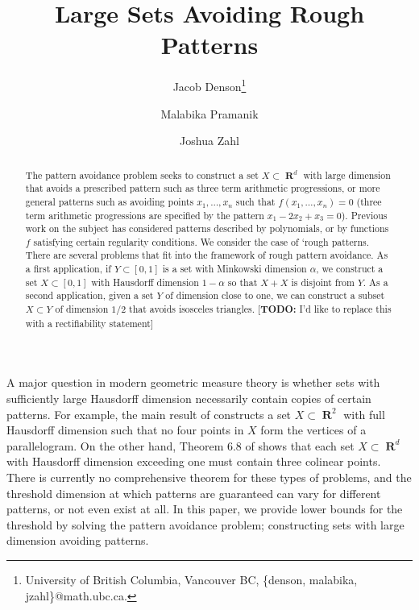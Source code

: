 \documentclass[dvipsnames,letterpaper,12pt]{article}
\title{Large Sets Avoiding Rough Patterns}
\author{Jacob Denson\thanks{University of British Columbia, Vancouver BC, \{denson, malabika, jzahl\}@math.ubc.ca.} \and Malabika Pramanik\footnotemark[1] \and Joshua Zahl\footnotemark[1]}
\numberwithin{equation}{section}
\theoremstyle{plain}
\DeclareMathOperator{\RR}{\mathbf{R}}
\begin{document}
\maketitle

\begin{abstract}
	The pattern avoidance problem seeks to construct a set $X\subset \RR^d$ with large dimension that avoids a prescribed pattern such as three term arithmetic progressions, or more general patterns such as avoiding points $x_1, \dots, x_n$ such that $f(x_1, \dots, x_n) = 0$ (three term arithmetic progressions are specified by the pattern $x_1 - 2x_2 + x_3 = 0$). Previous work on the subject has considered patterns described by polynomials, or by functions $f$ satisfying certain regularity conditions. We consider the case of `rough patterns.
	There are several problems that fit into the framework of rough pattern avoidance. As a first application, if $Y \subset [0,1]$ is a set with Minkowski dimension $\alpha$, we construct a set $X \subset [0,1]$ with Hausdorff dimension $1-\alpha$ so that $X+X$ is disjoint from $Y$. As a second application, given a set $Y$ of dimension close to one, we can construct a subset $X \subset Y$ of dimension $1/2$ that avoids isosceles triangles. [{\bf{TODO:}} I'd like to replace this with a rectifiability statement]
\end{abstract}













A major question in modern geometric measure theory is whether sets with sufficiently large Hausdorff dimension necessarily contain copies of certain patterns. For example, the main result of \cite{Maga} constructs a set $X \subset \RR^2$ with full Hausdorff dimension such that no four points in $X$ form the vertices of a parallelogram. On the other hand, Theorem 6.8 of \cite{Matilla} shows that each set $X \subset \RR^d$ with Hausdorff dimension exceeding one must contain three colinear points. There is currently no comprehensive theorem  for these types of problems, and the threshold dimension at which patterns are guaranteed can vary for different patterns, or not even exist at all. In this paper, we provide lower bounds for the threshold by solving the pattern avoidance problem; constructing sets with large dimension avoiding patterns.
\end{document}
